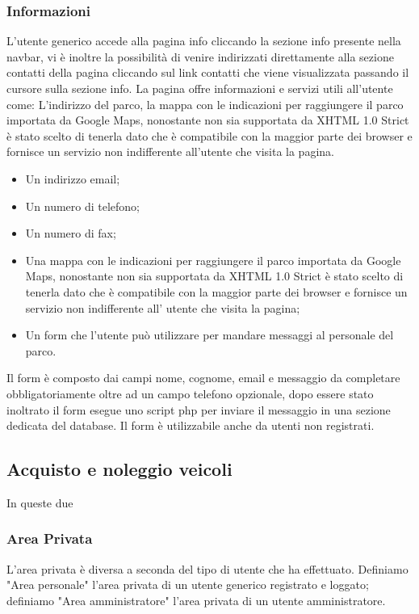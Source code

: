             \subsubsection{Informazioni}
            L’utente generico accede alla pagina info cliccando la sezione info presente nella navbar, vi è inoltre la possibilità di venire indirizzati direttamente alla sezione contatti della pagina cliccando sul link contatti che viene visualizzata passando il cursore sulla sezione info. La pagina offre informazioni e servizi utili all’utente come:
            L’indirizzo del parco, la mappa con le indicazioni per raggiungere il parco importata da Google Maps, nonostante non sia supportata da XHTML 1.0 Strict è stato scelto di tenerla dato che è compatibile con la maggior parte dei browser e fornisce un servizio non indifferente all’utente che visita la pagina.
            \begin{itemize}
                \item Un indirizzo email;
                \item Un numero di telefono;
                \item Un numero di fax;
                \item Una mappa con le indicazioni per raggiungere il parco importata da Google Maps, nonostante non sia supportata da XHTML 1.0 Strict è stato scelto di tenerla dato che è compatibile con la maggior parte dei browser e fornisce un servizio non indifferente all’ utente che visita la pagina;
                \item Un form che l’utente può utilizzare per mandare messaggi al personale del parco.
            \end{itemize}
            Il form è composto dai campi nome, cognome, email e messaggio da completare obbligatoriamente oltre ad un campo telefono opzionale, dopo essere stato inoltrato il form esegue uno script php per inviare il messaggio in una sezione dedicata del database. Il form è utilizzabile anche da utenti non registrati.

        \subsection{Acquisto e noleggio veicoli}
        In queste due

        \subsubsection{Area Privata}
            L'area privata è diversa a seconda del tipo di utente che ha effettuato. Definiamo "Area personale" l'area privata di un utente generico registrato e loggato; definiamo "Area amministratore" l'area privata di un utente amministratore.
